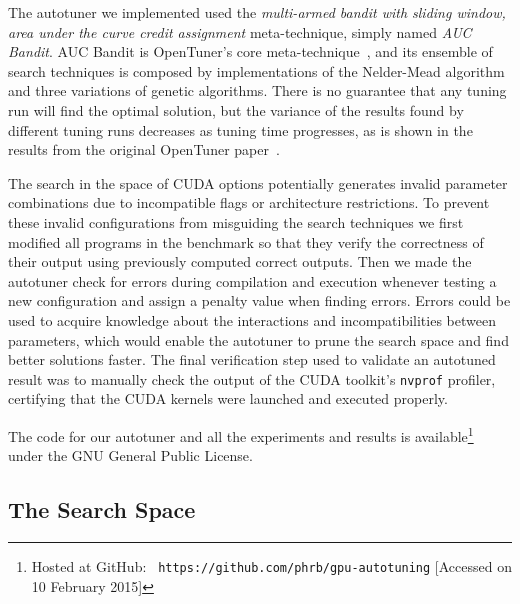 The autotuner we implemented used the \textit{multi-armed bandit with sliding
window, area under the curve credit assignment} meta-technique, simply named
\textit{AUC Bandit}.  AUC Bandit is OpenTuner's core
meta-technique~\cite{ansel2014opentuner}, and its ensemble of search techniques
is composed by implementations of the Nelder-Mead algorithm and three
variations of genetic algorithms.  There is no guarantee that any tuning run
will find the optimal solution, but the variance of the results found by
different tuning runs decreases as tuning time progresses, as is shown in the
results from the original OpenTuner paper~\cite{ansel2014opentuner}.

The search in the space of CUDA options potentially generates invalid parameter
combinations due to incompatible flags or architecture restrictions.  To
prevent these invalid configurations from misguiding the search techniques we
first modified all programs in the benchmark so that they verify the
correctness of their output using previously computed correct outputs. Then we
made the autotuner check for errors during compilation and execution whenever
testing a new configuration and assign a penalty value when finding errors.
Errors could be used to acquire knowledge about the interactions and
incompatibilities between parameters, which would enable the autotuner to prune
the search space and find better solutions faster.  The final verification step
used to validate an autotuned result was to manually check the output of the
CUDA toolkit's \texttt{nvprof} profiler, certifying that the CUDA kernels were
launched and executed properly.

The code for our autotuner and all the experiments and results is
available\footnote{Hosted at GitHub: \texttt{\scriptsize
https://github.com/phrb/gpu-autotuning} [Accessed on 10 February 2015]} under
the GNU General Public License.

\subsection{The Search Space}
\label{sec:parameters}

\newcommand{\specialcell}[1]{\begin{minipage}[m]{0.52\columnwidth}\centering#1\end{minipage}}

